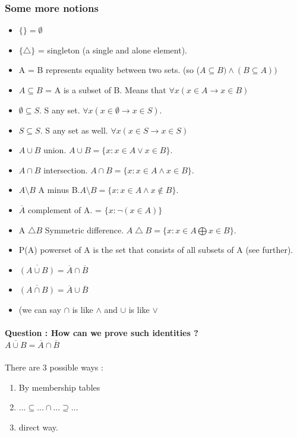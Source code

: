 \documentclass[12pt,a4paper]{article}
\begin{document}
\subsubsection{Some more notions}
\begin{itemize}
	\item $\{\} = \emptyset$
	\item $\{\bigtriangleup\}$ = singleton (a single and alone element).
	\item A = B represents equality between two sets. (so ($A \subseteq B) \wedge ( B \subseteq A))$
	\item $A \subseteq B$ = A is a subset of B. Means that $\forall x ( x \in A \rightarrow x \in B)$
	\item $\emptyset \subseteq S$. S any set. $\forall x ( x \in \emptyset \rightarrow x \in S)$.
	\item $S \subseteq S$. S any set as well. $\forall x ( x \in S \rightarrow x \in S)$
	\item $A \cup B$ union. $A \cup B = \{x : x \in A \vee x \in B\}$.
	\item $A \cap B$ intersection. $A \cap B = \{x : x \in A \wedge x \in B\}$.
	\item $A \setminus B$ A minus B.$A \setminus B = \{x : x \in A \wedge x \not\in B\}$.
	\item $\overline{A}$ complement of A. = $\{x : \neg (x \in A)\}$
	\item A $\bigtriangleup B$ Symmetric difference. $A \bigtriangleup B = \{x : x \in A \bigoplus x \in B\}$.
	\item P(A) powerset of A is the set that consists of all subsets of A (see further). 
	\item $\overline{(A \cup B)} = \overline{A} \cap \overline{B}$
	\item $\overline{(A \cap B)} = \overline{A} \cup \overline{B}$
	\item (we can say $\cap$ is like $\wedge$ and $\cup$ is like $\vee$
\end{itemize}
\paragraph{Question : How can we prove such identities ?\\ $\overline{A \cup B} = \overline{A} \cap \overline{B}$\\}
There are 3 possible ways :
\begin{enumerate}
	\item By membership tables
	\item $...\subseteq...\cap...\supseteq...$
	\item direct way.
\end{enumerate}
\end{document}
